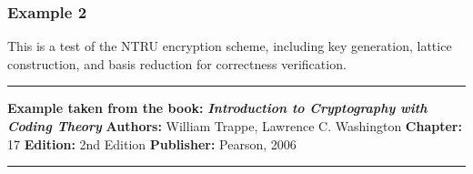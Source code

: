 \documentclass[a4paper,12pt]{article}
\begin{document}



\subsubsection*{Example 2 }\label{example-3-reference}

This is a test of the NTRU encryption scheme, including key generation,  
lattice construction, and basis reduction for correctness verification.

\begin{center}\rule{0.5\linewidth}{0.5pt}\end{center}

 \textbf{Example taken from the book:} \textbf{\emph{Introduction to
Cryptography with Coding Theory}} \textbf{Authors:} William Trappe,
Lawrence C. Washington \textbf{Chapter:} 17 \textbf{Edition:} 2nd
Edition \textbf{Publisher:} Pearson, 2006

\begin{center}\rule{0.5\linewidth}{0.5pt}\end{center}
\end{document}
